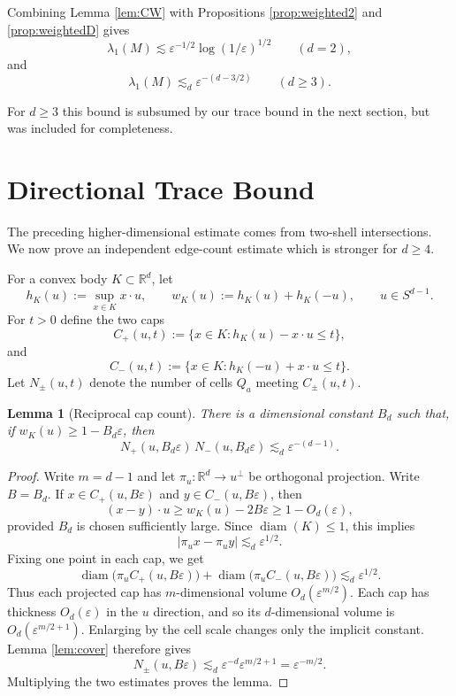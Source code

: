 \documentclass[11pt]{article}
\newtheorem{lemma}[theorem]{Lemma}
\newcommand{\R}{\mathbb R}
\newcommand{\eps}{\varepsilon}
\newcommand{\diam}{\operatorname{diam}}
\begin{document}
\smallskip
\noindent
Combining Lemma \ref{lem:CW} with Propositions \ref{prop:weighted2} and \ref{prop:weightedD} gives
\[
   \lambda_1(M)
   \lesssim
   \eps^{-1/2}\log(1/\eps)^{1/2}
   \qquad(d=2),
\]
and
\[
   \lambda_1(M)
   \lesssim_d
   \eps^{-(d-3/2)}
   \qquad(d\ge3).
\]

\smallskip
\noindent
For $d \ge 3$ this bound is subsumed by our trace bound in the next section, but was included for completeness.

\section{Directional Trace Bound}

The preceding higher-dimensional estimate comes from two-shell intersections.  We now prove an independent edge-count estimate which is stronger for $d\ge4$.

\bigskip
\noindent
For a convex body $K\subset\R^d$, let
\[
   h_K(u):=\sup_{x\in K}x\cdot u,
   \qquad
   w_K(u):=h_K(u)+h_K(-u),
   \qquad u\in S^{d-1}.
\]
For $t>0$ define the two caps
\[
   C_+(u,t):=\{x\in K:h_K(u)-x\cdot u\le t\},
\]
and
\[
   C_-(u,t):=\{x\in K:h_K(-u)+x\cdot u\le t\}.
\]
Let $N_\pm(u,t)$ denote the number of cells $Q_a$ meeting $C_\pm(u,t)$.

\begin{lemma}[Reciprocal cap count]\label{lem:capcount}
There is a dimensional constant $B_d$ such that, if $w_K(u)\ge1-B_d\eps$, then
\[
   N_+(u,B_d\eps)\,N_-(u,B_d\eps)
   \lesssim_d
   \eps^{-(d-1)}.
\]
\end{lemma}

\begin{proof}
Write $m=d-1$ and let $\pi_u:\R^d\to u^\perp$ be orthogonal projection.  Write $B=B_d$.  If $x\in C_+(u,B\eps)$ and $y\in C_-(u,B\eps)$, then
\[
   (x-y)\cdot u
   \ge
   w_K(u)-2B\eps
   \ge
   1-O_d(\eps),
\]
provided $B_d$ is chosen sufficiently large.  Since $\diam(K)\le1$, this implies
\[
   |\pi_u x-\pi_u y|
   \lesssim_d
   \eps^{1/2}.
\]
Fixing one point in each cap, we get
\[
   \diam\big(\pi_u C_+(u,B\eps)\big)
   +
   \diam\big(\pi_u C_-(u,B\eps)\big)
   \lesssim_d
   \eps^{1/2}.
\]
Thus each projected cap has $m$-dimensional volume $O_d(\eps^{m/2})$.  Each cap has thickness $O_d(\eps)$ in the $u$ direction, and so its $d$-dimensional volume is $O_d(\eps^{m/2+1})$.  Enlarging by the cell scale changes only the implicit constant.  Lemma \ref{lem:cover} therefore gives
\[
   N_\pm(u,B\eps)
   \lesssim_d
   \eps^{-d}\eps^{m/2+1}
   =
   \eps^{-m/2}.
\]
Multiplying the two estimates proves the lemma.
\end{proof}
\end{document}
